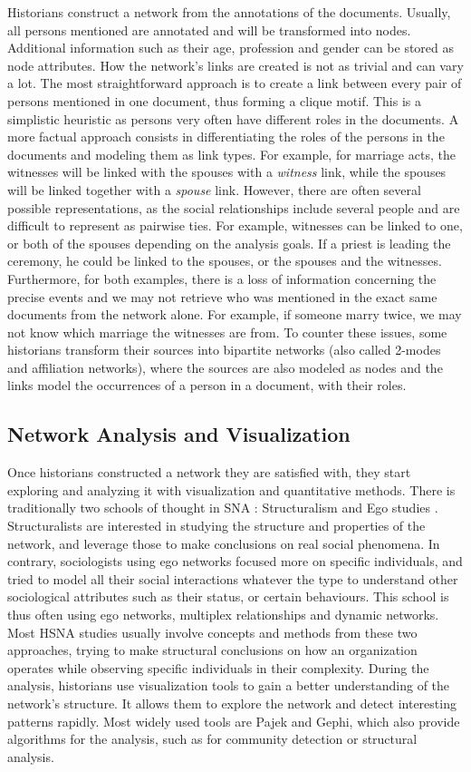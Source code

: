 \documentclass{vgtc}                          %
\begin{document}
Historians construct a network from the annotations of the documents. Usually, all persons mentioned are annotated and will be transformed into nodes. Additional information such as their age, profession and gender can be stored as node attributes. 
How the network's links are created is not as trivial and can vary a lot. The most straightforward approach is to create a link between every pair of persons mentioned in one document, thus forming a clique motif. This is a simplistic heuristic as persons very often have different roles in the documents.
A more factual approach consists in differentiating the roles of the persons in the documents and modeling them as link types. For example, for marriage acts, the witnesses will be linked with the spouses with a \textit{witness} link, while the spouses will be linked together with a \textit{spouse} link. However, there are often several possible representations, as the social relationships include several people and are difficult to represent as pairwise ties. For example, witnesses can be linked to one, or both of the spouses depending on the analysis goals. If a priest is leading the ceremony, he could be linked to the spouses, or the spouses and the witnesses.
Furthermore, for both examples, there is a loss of information concerning the precise events and we may not retrieve who was mentioned in the exact same documents from the network alone. For example, if someone marry twice, we may not know which marriage the witnesses are from.
To counter these issues, some historians transform their sources into bipartite networks (also called 2-modes and affiliation networks), where the sources are also modeled as nodes and the links model the occurrences of a person in a document, with their roles.

\subsection{Network Analysis and Visualization}

Once historians constructed a network they are satisfied with, they start exploring and analyzing it with visualization and quantitative methods. 
There is traditionally two schools of thought in SNA : Structuralism and Ego studies \cite{eve_deux_2002}. Structuralists are interested in studying the structure and properties of the network, and leverage those to make conclusions on real social phenomena. 
In contrary, sociologists using ego networks focused more on specific individuals, and tried to model all their social interactions whatever the type to understand other sociological attributes such as their status, or certain behaviours. This school is thus often using ego networks, multiplex relationships and dynamic networks.
Most HSNA studies usually involve concepts and methods from these two approaches, trying to make structural conclusions on how an organization operates while observing specific individuals in their complexity.
During the analysis, historians use visualization tools to gain a better understanding of the network's structure. It allows them to explore the network and detect interesting patterns rapidly. Most widely used tools are Pajek and Gephi, which also provide algorithms for the analysis, such as for community detection or structural analysis.
\end{document}
